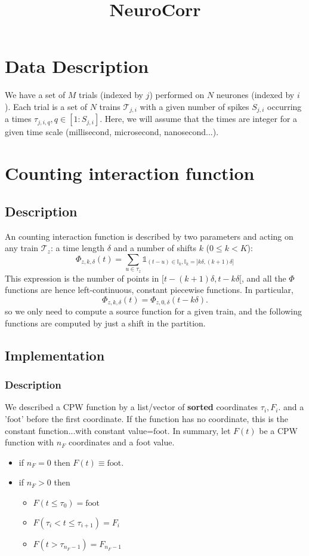 \documentclass{revtex4}
\begin{document}
\title{NeuroCorr}
\maketitle

\section{Data Description}
We have a set of $M$ trials (indexed by $j$) performed on $N$ neurones (indexed by $i$).
Each trial is a set of $N$ trains $\mathcal{T}_{j,i}$ with a
given number of spikes $S_{j,i}$ occurring a times $\tau_{j,i,q}, q\in[1:S_{j,i}]$.
Here, we will assume that the times are integer for a given time scale (millisecond, microsecond, nanosecond...).

\section{Counting interaction function}
\subsection{Description}
An counting interaction function is described by two parameters and acting on any train $\mathcal{T}_z$: a time length $\delta$ and a number
of shifts $k$ ($0\leq k < K$):
$$
	\Phi_{z,k,\delta}(t) = 
	\sum_{u\in\tau_{z}}
	 \mathds{1}_{(t-u)\in\mathbb{I}_k,\mathbb{I}_k=\rbrack k\delta,(k+1)\delta\rbrack}
$$
This expression is the number of points in $\lbrack t-(k+1)\delta,t-k\delta\lbrack$, and all the $\Phi$ functions
are hence left-continuous, constant piecewise functions.
In particular,
$$
	\Phi_{z,k,\delta}(t) = \Phi_{z,0,\delta}(t-k\delta).
$$
so we only need to compute a source function for a given train, and the following functions are computed by just
a shift in the partition.

\subsection{Implementation}
\subsubsection{Description}
We described a CPW function by a list/vector of \textbf{sorted} coordinates $\tau_i,F_i$.
and a '$\mathrm{foot}$' before the first coordinate. If the function has no coordinate, this
is the constant function...with constant value=$\mathrm{foot}$.
In summary, let $F(t)$ be a CPW function with $n_F$  coordinates and a foot value.
\begin{itemize}
	\item if $n_F=0$ then $F(t)\equiv\mathrm{foot}$.
	\item if $n_F>0$ then
	\begin{itemize}
		\item $F(t\leq\tau_0) = \mathrm{foot}$
		\item $F(\tau_{i}<t\leq\tau_{i+1}) = F_i$
		\item $F(t>\tau_{n_F-1})           = F_{n_F-1}$
	\end{itemize}
\end{itemize}
\end{document}
